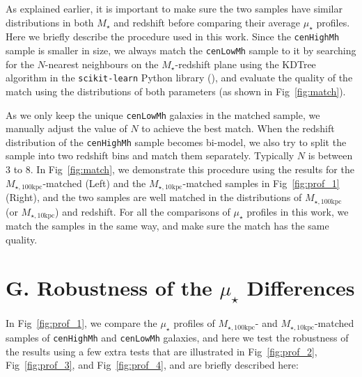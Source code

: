 \documentclass[a4paper,fleqn,usenatbib]{mnras}
\def\rbcg{\texttt{cenHighMh}}
\def\nbcg{\texttt{cenLowMh}}
\def\mstar{{$M_{\star}$}}
\def\minn{{$M_{\star,10\mathrm{kpc}}$}}
\def\mtot{{$M_{\star,100\mathrm{kpc}}$}}
\def\mden{{$\mu_{\star}$}}
\begin{document}
    As explained earlier, it is important to make sure the two samples have similar 
    distributions in both \mstar{} and redshift before comparing their average \mden{} 
    profiles.  
    Here we briefly describe the procedure used in this work. 
    Since the \rbcg{} sample is smaller in size, we always match the \nbcg{} sample to 
    it by searching for the $N$-nearest neighbours on the $M_{\star}$-redshift plane 
    using the KDTree algorithm in the \texttt{scikit-learn} Python library 
    (\citealt{scikit-learn}), and evaluate the quality of the match using the 
    distributions of both parameters (as shown in Fig~\ref{fig:match}). 
 
    As we only keep the unique \nbcg{} galaxies in the matched sample, we manually 
    adjust the value of $N$ to achieve the best match. 
    When the redshift distribution of the \rbcg{} sample becomes bi-model, we also try 
    to split the sample into two redshift bins and match them separately. 
    Typically $N$ is between 3 to 8.
    In Fig~\ref{fig:match}, we demonstrate this procedure using the results for 
    the \mtot{}-matched (Left) and the \minn{}-matched samples in Fig~\ref{fig:prof_1}
    (Right), and the two samples are well matched in the distributions of \mtot{}
    (or \minn{}) and redshift.  
    For all the comparisons of \mden{} profiles in this work, we match the samples 
    in the same way, and make sure the match has the same quality. 
    
\section{G. Robustness of the \mden{} Differences} 
	\label{app:robust}
    
    In Fig~\ref{fig:prof_1}, we compare the \mden{} profiles of \mtot{}- and 
    \minn{}-matched samples of \rbcg{} and \nbcg{} galaxies, and here we test the 
    robustness of the results using a few extra tests that are illustrated in
    Fig~\ref{fig:prof_2}, Fig~\ref{fig:prof_3}, and Fig~\ref{fig:prof_4}, and 
    are briefly described here:   
    
\end{document}
